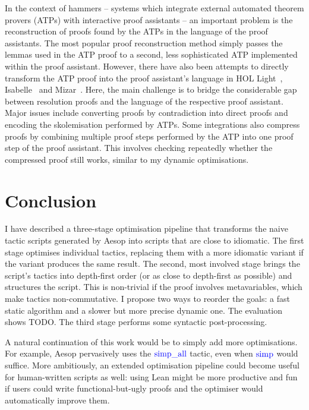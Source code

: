 \documentclass[sigplan,10pt,anonymous,review]{acmart}
\newcommand{\tac}[1]{\ensuremath{\mathrm{\mathcolor{blue}{#1}}}}
\begin{document}
In the context of hammers -- systems which integrate external automated theorem provers (ATPs) with interactive proof assistants -- an important problem is the reconstruction of proofs found by the ATPs in the language of the proof assistants.
The most popular proof reconstruction method simply passes the lemmas used in the ATP proof to a second, less sophisticated ATP implemented within the proof assistant.
However, there have also been attempts to directly transform the ATP proof into the proof assistant's language in HOL Light~\cite{PRocH}, Isabelle~\cite{Paulson2007,Blanchette2013a,Blanchette2013b,Blanchette2016} and Mizar~\cite{ATPMizar,MizarATP}.
Here, the main challenge is to bridge the considerable gap between resolution proofs and the language of the respective proof assistant.
Major issues include converting proofs by contradiction into direct proofs and encoding the skolemisation performed by ATPs.
Some integrations also compress proofs by combining multiple proof steps performed by the ATP into one proof step of the proof assistant.
This involves checking repeatedly whether the compressed proof still works, similar to my dynamic optimisations.

\section{Conclusion}%
\label{sec:concl}

I have described a three-stage optimisation pipeline that transforms the naive tactic scripts generated by Aesop into scripts that are close to idiomatic.
The first stage optimises individual tactics, replacing them with a more idiomatic variant if the variant produces the same result.
The second, most involved stage brings the script's tactics into depth-first order (or as close to depth-first as possible) and structures the script.
This is non-trivial if the proof involves metavariables, which make tactics non-commutative.
I propose two ways to reorder the goals: a fast static algorithm and a slower but more precise dynamic one.
The evaluation shows TODO.
The third stage performs some syntactic post-processing.

A natural continuation of this work would be to simply add more optimisations.
For example, Aesop pervasively uses the \tac{simp\_all} tactic, even when \tac{simp} would suffice.
More ambitiously, an extended optimisation pipeline could become useful for human-written scripts as well:
using Lean might be more productive and fun if users could write functional-but-ugly proofs and the optimiser would automatically improve them.



\end{document}
